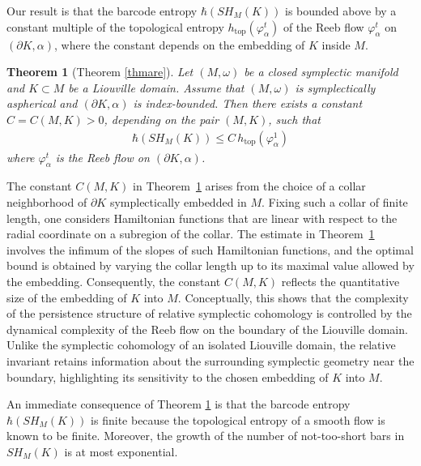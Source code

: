 \documentclass[12pt]{amsart}
\newtheorem{introtheorem}{Theorem}
\theoremstyle{definition}
\begin{document}
Our result is that the barcode entropy $\hbar(SH_M(K))$ is bounded above by a constant multiple of the topological entropy $h_{\textrm{top}}(\varphi_\alpha^t)$ of the Reeb flow $\varphi_\alpha^t$ on $(\partial K, \alpha)$, where the constant depends on the embedding of $K$ inside $M$.

\begin{introtheorem}[Theorem \ref{thmare}]\label{thma}
    Let $(M,\omega)$ be a closed symplectic manifold and  $K \subset M$ be a Liouville domain. Assume that $(M,\omega)$ is symplectically aspherical and $(\partial K, \alpha)$ is index-bounded. Then there exists a constant $C=C(M,K) >0$, depending on the pair $(M,K)$, such that
    \begin{align*}
        \hbar(SH_M(K)) \leq C \,h_{\textrm{top}}(\varphi_\alpha^1)
    \end{align*}
    where $\varphi_\alpha^t$ is the Reeb flow on $(\partial K, \alpha)$.
\end{introtheorem}


The constant $C(M,K)$ in Theorem~\ref{thma} arises from the choice of a collar neighborhood of $\partial K$ symplectically embedded in $M$. Fixing such a collar of finite length, one considers Hamiltonian functions that are linear with respect to the radial coordinate on a subregion of the collar. The estimate in Theorem~\ref{thma} involves the infimum of the slopes of such Hamiltonian functions, and the optimal bound is obtained by varying the collar length up to its maximal value allowed by the embedding. Consequently, the constant $C(M,K)$ reflects the quantitative size of the embedding of $K$ into $M$. Conceptually, this shows that the complexity of the persistence structure of relative symplectic cohomology is controlled by the dynamical complexity of the Reeb flow on the boundary of the Liouville domain. Unlike the symplectic cohomology of an isolated Liouville domain, the relative invariant retains information about the surrounding symplectic geometry near the boundary, highlighting its sensitivity to the chosen embedding of $K$ into $M$.

\vspace{0.2cm}

An immediate consequence of Theorem \ref{thma} is that the barcode entropy $\hbar(SH_M(K))$ is finite because the topological entropy of a smooth flow is known to be finite. Moreover, the growth of the number of not-too-short bars in $SH_M(K)$ is at most exponential.
\end{document}
